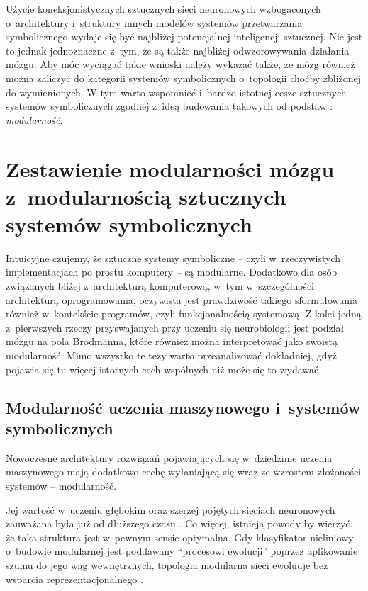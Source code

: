 Użycie koneksjonistycznych sztucznych sieci neuronowych wzbogaconych o~architektury i~struktury innych modelów systemów przetwarzania symbolicznego wydaje się być najbliżej potencjalnej inteligencji sztucznej.
Nie jest to jednak jednoznaczne z~tym, że są także najbliżej odwzorowywania działania mózgu.
Aby móc wyciągać takie wnioski należy wykazać także, że mózg również można zaliczyć do kategorii systemów symbolicznych o~topologii choćby zbliżonej do wymienionych.
W tym warto wspomnieć i~bardzo istotnej cesze sztucznych systemów symbolicznych zgodnej z~ideą budowania takowych od podstaw \cite{bechtel1993case}: \emph{modularność}.

\section{Zestawienie modularności mózgu z~modularnością sztucznych systemów symbolicznych}

Intuicyjne czujemy, że sztuczne systemy symboliczne -- czyli w~rzeczywistych implementacjach po prostu komputery -- są modularne.
Dodatkowo dla osób związanych bliżej z~architekturą komputerową, w~tym w~szczególności architekturą oprogramowania, oczywista jest prawdziwość takiego sformułowania również w~kontekście programów, czyli funkcjonalnością systemową.
Z kolei jedną z~pierwszych rzeczy przyswajanych przy uczeniu się neurobiologii jest podział mózgu na pola Brodmanna, które również można interpretować jako swoistą modularność.
Mimo wszystko te tezy warto przeanalizować dokładniej, gdyż pojawia się tu więcej istotnych cech wspólnych niż może się to wydawać.

\subsection{Modularność uczenia maszynowego i~systemów symbolicznych}

Nowoczesne architektury rozwiązań pojawiających się w~dziedzinie uczenia maszynowego mają dodatkowo cechę wyłaniającą się wraz ze wzrostem złożoności systemów -- modularność.

Jej wartość w~uczeniu głębokim oraz szerzej pojętych sieciach neuronowych zauważana była już od dłuższego czasu \cite{schmidt1998modularity}.
Co więcej, istnieją powody by wierzyć, że taka struktura jest w~pewnym sensie optymalna.
Gdy klasyfikator nieliniowy o~budowie modularnej jest poddawany ``procesowi ewolucji'' poprzez aplikowanie szumu do jego wag wewnętrznych, topologia modularna sieci ewoluuje bez wsparcia reprezentacjonalnego \cite{hoverstad2011noise}.

